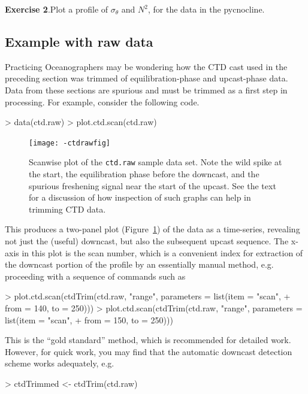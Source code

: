 \documentclass{article}
\newcommand{\workedexercise}[2]{
	\vspace{2ex plus 2ex minus 1ex}
	\begin{boxedminipage}[c]{0.95\linewidth}
		{\textbf{Exercise #1}.\hspace{1em}#2}
	\end{boxedminipage}
	\vspace{2ex plus 2ex minus 1ex}
}
\begin{document}
\workedexercise{2}{Plot a profile of $\sigma_\theta$ and $N^2$, for the data in the pycnocline.}

\subsection{Example with raw data}

Practicing Oceanographers may be wondering how the CTD cast used in the
preceding section was trimmed of equilibration-phase and upcast-phase data. Data
from these sections are spurious and must be trimmed as a first step in
processing. For example, consider the following code.
\begin{Schunk}
\begin{Sinput}
> data(ctd.raw)
> plot.ctd.scan(ctd.raw)
\end{Sinput}
\end{Schunk}
\begin{figure}
\begin{center}
\texttt{[image: -ctdrawfig]}
\end{center}
\caption{Scanwise plot of the \texttt{ctd.raw} sample data set.  Note the wild
spike at the start, the equilibration phase before the downcast, and the
spurious freshening signal near the start of the upcast.  See the text for a
discussion of how inspection of such graphs can help in trimming CTD data.}
\label{fig:ctdraw}
\end{figure}

\noindent This produces a two-panel plot (Figure~\ref{fig:ctdraw}) of the data
as a time-series, revealing not just the (useful) downcast, but also the
subsequent upcast sequence.  The x-axis in this plot is the scan number, which
is a convenient index for extraction of the downcast portion of the profile by
an essentially manual method, e.g. proceeding with a sequence of commands such
as
\begin{Schunk}
\begin{Sinput}
> plot.ctd.scan(ctdTrim(ctd.raw, "range", parameters = list(item = "scan", 
+     from = 140, to = 250)))
> plot.ctd.scan(ctdTrim(ctd.raw, "range", parameters = list(item = "scan", 
+     from = 150, to = 250)))
\end{Sinput}
\end{Schunk}
This is the ``gold standard'' method, which is recommended for detailed
work. However, for quick work, you may find that the automatic downcast
detection scheme works adequately, e.g.
\begin{Schunk}
\begin{Sinput}
> ctdTrimmed <- ctdTrim(ctd.raw)
\end{Sinput}
\end{Schunk}
\end{document}
